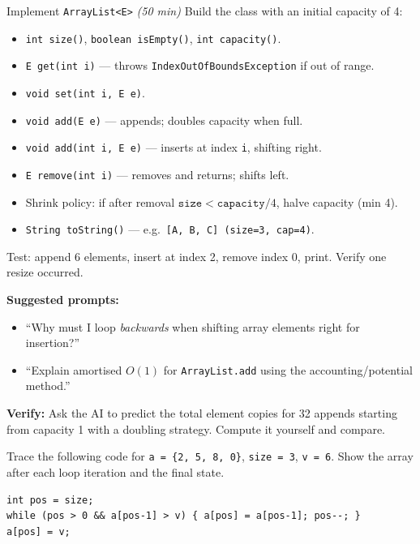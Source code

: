 \documentclass[11pt]{article}
\begin{document}
\begin{labexercise}{Implement \texttt{ArrayList<E>} \hfill {\small \itshape (50 min)}}
Build the class with an initial capacity of 4:
\begin{itemize}[leftmargin=*,nosep]
  \item \texttt{int size()}, \texttt{boolean isEmpty()}, \texttt{int capacity()}.
  \item \texttt{E get(int i)} --- throws \texttt{IndexOutOfBoundsException} if out of range.
  \item \texttt{void set(int i, E e)}.
  \item \texttt{void add(E e)} --- appends; doubles capacity when full.
  \item \texttt{void add(int i, E e)} --- inserts at index \texttt{i}, shifting right.
  \item \texttt{E remove(int i)} --- removes and returns; shifts left.
  \item Shrink policy: if after removal $\texttt{size} < \texttt{capacity}/4$, halve capacity (min 4).
  \item \texttt{String toString()} --- e.g.\ \texttt{[A, B, C] (size=3, cap=4)}.
\end{itemize}
Test: append 6 elements, insert at index 2, remove index 0, print. Verify one resize occurred.
\end{labexercise}

\begin{aicollab}
\textbf{Suggested prompts:}
\begin{itemize}[leftmargin=*,nosep]
  \item ``Why must I loop \emph{backwards} when shifting array elements right for insertion?''
  \item ``Explain amortised $O(1)$ for \texttt{ArrayList.add} using the accounting/potential method.''
\end{itemize}
\medskip\textbf{Verify:} Ask the AI to predict the total element copies for 32 appends starting from
capacity 1 with a doubling strategy. Compute it yourself and compare.
\end{aicollab}

\takehomebanner

\begin{trace}
Trace the following code for \texttt{a = \{2, 5, 8, 0\}}, \texttt{size = 3}, \texttt{v = 6}.
Show the array after each loop iteration and the final state.
\begin{lstlisting}
int pos = size;
while (pos > 0 && a[pos-1] > v) { a[pos] = a[pos-1]; pos--; }
a[pos] = v;
\end{lstlisting}
\end{trace}
\end{document}
